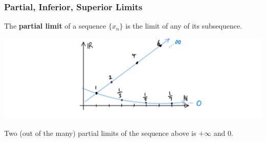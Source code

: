 \documentclass{article}
\begin{document}
    \subsubsection{Partial, Inferior, Superior Limits}

      \begin{definition}
        The \textbf{partial limit} of a sequence $\{x_n\}$ is the limit of any of its subsequence.  
        \begin{center}
            \includegraphics[scale=0.26]{img/Partial_Limit.PNG}
        \end{center}
        Two (out of the many) partial limits of the sequence above is $+\infty$ and $0$. 
      \end{definition}
\end{document}

